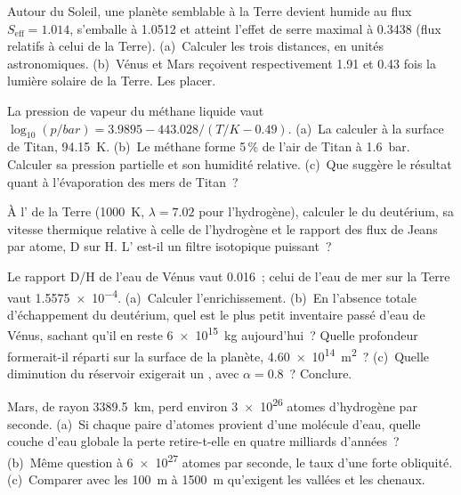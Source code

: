 \begin{exercise}[$\star$]\label{exo:b3:planetary-atmospheres:3}
Autour du Soleil, une planète semblable à la Terre devient humide au flux $S_\mathrm{eff}
= 1.014$, s'emballe à 1.0512 et atteint l'effet de serre maximal à 0.3438
(flux relatifs à celui de la Terre). (a)~Calculer les trois distances, en
unités astronomiques. (b)~Vénus et Mars reçoivent respectivement 1.91 et 0.43 fois
la lumière solaire de la Terre. Les placer.
\end{exercise}

\begin{exercise}[$\star$]\label{exo:b3:planetary-atmospheres:4}
La pression de vapeur du méthane liquide vaut $\log_{10}(p/\unit{bar}) = 3.9895 -
443.028/(T/\unit{K} - 0.49)$. (a)~La calculer à la surface de Titan,
\qty{94.15}{K}. (b)~Le méthane forme 5\,\% de l'air de Titan à \qty{1.6}{bar}.
Calculer sa pression partielle et son humidité relative. (c)~Que suggère le
résultat quant à l'évaporation des mers de Titan~?
\end{exercise}

\begin{exercise}[$\star\star$]\label{exo:b3:planetary-atmospheres:5}
À l' de la Terre (\qty{1000}{K}, $\lambda = 7.02$ pour l'hydrogène),
calculer le  du deutérium, sa vitesse thermique relative à
celle de l'hydrogène et le rapport des flux de Jeans par atome, D sur H. L' est-il un filtre isotopique puissant~?
\end{exercise}

\begin{exercise}[$\star\star$]\label{exo:b3:planetary-atmospheres:6}
Le rapport D/H de l'eau de Vénus vaut \num{0.016}~; celui de l'eau de mer sur
la Terre vaut \num{1.5575e-4}. (a)~Calculer l'enrichissement. (b)~En l'absence
totale d'échappement du deutérium, quel est le plus petit inventaire passé d'eau
de Vénus, sachant qu'il en reste \qty{6e15}{kg} aujourd'hui~? Quelle profondeur
formerait-il réparti sur la surface de la planète, \qty{4.60e14}{m^2}~? (c)~Quelle
diminution du réservoir exigerait un , avec $\alpha = 0.8$~? Conclure.
\end{exercise}

\begin{exercise}[$\star\star$]\label{exo:b3:planetary-atmospheres:7}
Mars, de rayon \qty{3389.5}{km}, perd environ \num{3e26} atomes d'hydrogène
par seconde. (a)~Si chaque paire d'atomes provient d'une molécule d'eau, quelle
couche d'eau globale la perte retire-t-elle en quatre milliards d'années~?
(b)~Même question à \num{6e27} atomes par seconde, le taux d'une forte
obliquité. (c)~Comparer avec les \qty{100}{m} à \qty{1500}{m} qu'exigent les
vallées et les chenaux.
\end{exercise}

